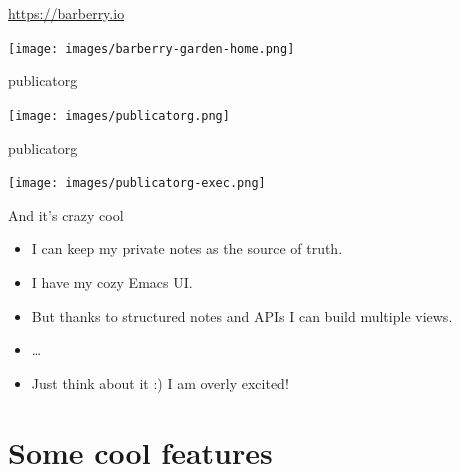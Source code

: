 \documentclass[presentation,aspectratio=169,smaller]{beamer}
\begin{document}
\begin{frame}[label={sec:org84f95ec}]{\url{https://barberry.io}}
\begin{center}
\texttt{[image: images/barberry-garden-home.png]}
\end{center}
\end{frame}
\begin{frame}[label={sec:orgc3b134f}]{publicatorg}
\begin{center}
\texttt{[image: images/publicatorg.png]}
\end{center}
\end{frame}
\begin{frame}[label={sec:orga9ffe78}]{publicatorg}
\begin{center}
\texttt{[image: images/publicatorg-exec.png]}
\end{center}
\end{frame}
\begin{frame}[label={sec:org70ac26b}]{And it's crazy cool}
\begin{itemize}
\item I can keep my private notes as the source of truth.
\item I have my cozy Emacs UI.
\item But thanks to structured notes and APIs I can build multiple views.
\item \ldots{}
\item Just think about it :) I am overly excited!
\end{itemize}
\end{frame}
\section{Some cool features}
\label{sec:org770dc60}
\end{document}
